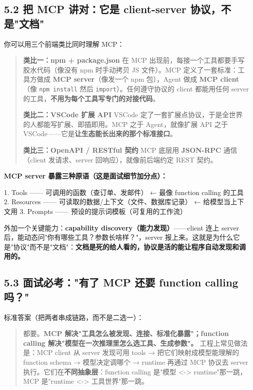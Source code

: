\subsection{5.2 把 MCP 讲对：它是 client-server 协议，不是"文档"}

你可以用三个前端类比同时理解 MCP：

\begin{quote}
 \textbf{类比一：npm + package.json}
在 MCP 出现前，每接一个工具都要手写胶水代码（像没有 npm 时手动拷贝 JS 文件）。MCP 定义了一套标准：工具方做成 \textbf{MCP server}（像发一个 npm 包），Agent 做成 \textbf{MCP client}（像 \texttt{npm install} 然后 \texttt{import}）。任何遵守协议的 client 都能用任何 server 的工具，\textbf{不用为每个工具写专门的对接代码}。

 \textbf{类比二：VSCode 扩展 API}
VSCode 定了一套扩展点协议，于是全世界的人都能写扩展、即插即用。MCP 之于 Agent，就像扩展 API 之于 VSCode——它是\textbf{让生态能长出来的那个标准接口}。

 \textbf{类比三：OpenAPI / RESTful 契约}
MCP 底层用 \textbf{JSON-RPC} 通信（client 发请求、server 回响应），就像前后端约定 REST 契约。
\end{quote}

\textbf{MCP server 暴露三种原语（这是面试细节加分点）：}

\begin{codeblock}
1. Tools     —— 可调用的函数（查订单、发邮件）         ← 最像 function calling 的工具
2. Resources —— 可读取的数据/上下文（文件、数据库记录）  ← 给模型当上下文用
3. Prompts   —— 预设的提示词模板（可复用的工作流）
\end{codeblock}

外加一个关键能力：\textbf{capability discovery（能力发现）}——client 连上 server 后，能动态问"你有哪些工具？参数长啥样？"，server 报上来。这就是为什么它是"协议"而不是"文档"：\textbf{文档是死的给人看的，协议是活的能让程序自动发现和调用的。}

\subsection{5.3 面试必考："有了 MCP 还要 function calling 吗？"}

标准答案（把两者串成链路，而不是二选一）：

\begin{quote}
都要。\textbf{MCP 解决"工具怎么被发现、连接、标准化暴露"；function calling 解决"模型在一次推理里怎么选工具、生成参数"。} 工程上常见做法是：MCP client 从 server 发现可用 tools → 把它们映射成模型能理解的 function schema → 模型决定调哪个 → runtime 再通过 MCP 协议去 server 执行。它们在\textbf{不同抽象层}：function calling 是"模型 <-> runtime"那一跳，MCP 是"runtime <-> 工具世界"那一跳。
\end{quote}

